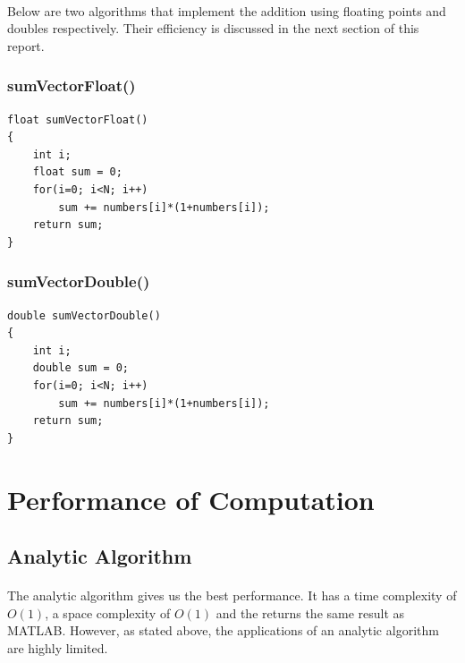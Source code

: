 \documentclass{article}
\begin{document}
\paragraph{}
Below are two algorithms that implement the addition using floating points and doubles respectively. Their efficiency is discussed in the next section of this report.

\subsubsection {sumVectorFloat()}
\begin{lstlisting}[frame=single]
float sumVectorFloat()
{
	int i;
	float sum = 0;
	for(i=0; i<N; i++)
		sum += numbers[i]*(1+numbers[i]);
	return sum;
}
\end{lstlisting}

\subsubsection {sumVectorDouble()}
\begin{lstlisting}[frame=single]
double sumVectorDouble()
{
	int i;
	double sum = 0;
	for(i=0; i<N; i++)
		sum += numbers[i]*(1+numbers[i]);
	return sum;
}
\end{lstlisting}

\newpage
\section{Performance of Computation}
\subsection{Analytic Algorithm}
\paragraph{}
The analytic algorithm gives us the best performance. It has a time complexity of $O(1)$, a space complexity of $O(1)$ and the returns the same result as MATLAB. However, as stated above, the applications of an analytic algorithm are highly limited.
\end{document}
